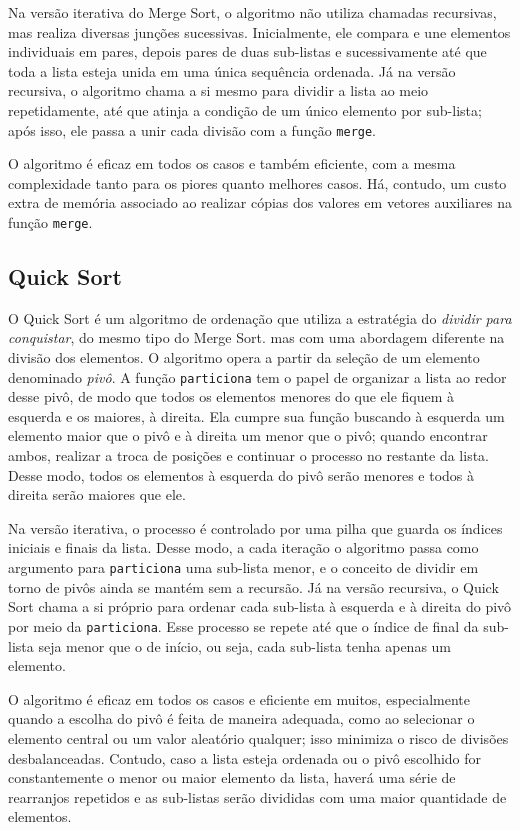 Na versão iterativa do Merge Sort, o algoritmo não utiliza chamadas recursivas, mas realiza diversas junções sucessivas. Inicialmente, ele compara e une elementos individuais em pares, depois pares de duas sub-listas e sucessivamente até que toda a lista esteja unida em uma única sequência ordenada. Já na versão recursiva, o algoritmo chama a si mesmo para dividir a lista ao meio repetidamente, até que atinja a condição de um único elemento por sub-lista; após isso, ele passa a unir cada divisão com a função \texttt{merge}.

O algoritmo é eficaz em todos os casos e também eficiente, com a mesma complexidade tanto para os piores quanto melhores casos. Há, contudo, um custo extra de memória associado ao realizar cópias dos valores em vetores auxiliares na função \texttt{merge}.

\subsection*{Quick Sort}
\hspace{0.6cm}O Quick Sort é um algoritmo de ordenação que utiliza a estratégia do \textit{dividir para conquistar}, do mesmo tipo do Merge Sort. mas com uma abordagem diferente na divisão dos elementos. O algoritmo opera a partir da seleção de um elemento denominado \textit{pivô}. A função \texttt{particiona} tem o papel de organizar a lista ao redor desse pivô, de modo que todos os elementos menores do que ele fiquem à esquerda e os maiores, à direita. Ela cumpre sua função buscando à esquerda um elemento maior que o pivô e à direita um menor que o pivô; quando encontrar ambos, realizar a troca de posições e continuar o processo no restante da lista. Desse modo, todos os elementos à esquerda do pivô serão menores e todos à direita serão maiores que ele.

Na versão iterativa, o processo é controlado por uma pilha que guarda os índices iniciais e finais da lista. Desse modo, a cada iteração o algoritmo passa como argumento para \texttt{particiona} uma sub-lista menor, e o conceito de dividir em torno de pivôs ainda se mantém sem a recursão. Já na versão recursiva, o Quick Sort chama a si próprio para ordenar cada sub-lista à esquerda e à direita do pivô por meio da \texttt{particiona}. Esse processo se repete até que o índice de final da sub-lista seja menor que o de início, ou seja, cada sub-lista tenha apenas um elemento.

O algoritmo é eficaz em todos os casos e eficiente em muitos, especialmente quando a escolha do pivô é feita de maneira adequada, como ao selecionar o elemento central ou um valor aleatório qualquer; isso minimiza o risco de divisões desbalanceadas. Contudo, caso a lista esteja ordenada ou o pivô escolhido for constantemente o menor ou maior elemento da lista, haverá uma série de rearranjos repetidos e as sub-listas serão divididas com uma maior quantidade de elementos. 
